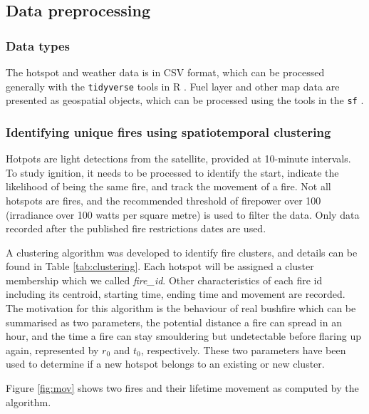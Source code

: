 \documentclass[11pt,a4paper,]{article}
\begin{document}
\hypertarget{data-preprocessing}{%
\subsection{Data preprocessing}\label{data-preprocessing}}

\hypertarget{data-types}{%
\subsubsection{Data types}\label{data-types}}

The hotspot and weather data is in CSV format, which can be processed generally with the \texttt{tidyverse} \autocite{R-tidyverse} tools in R \autocite{R}. Fuel layer and other map data are presented as geospatial objects, which can be processed using the tools in the \texttt{sf} \autocite{R-sf}.

\hypertarget{identifying-unique-fires-using-spatiotemporal-clustering}{%
\subsubsection{Identifying unique fires using spatiotemporal clustering}\label{identifying-unique-fires-using-spatiotemporal-clustering}}

Hotpots are light detections from the satellite, provided at 10-minute intervals. To study ignition, it needs to be processed to identify the start, indicate the likelihood of being the same fire, and track the movement of a fire. Not all hotspots are fires, and the recommended threshold of firepower over 100 (irradiance over 100 watts per square metre) is used to filter the data. Only data recorded after the published fire restrictions dates are used.

A clustering algorithm was developed to identify fire clusters, and details can be found in Table \ref{tab:clustering}. Each hotspot will be assigned a cluster membership which we called \emph{fire\_id}. Other characteristics of each fire id including its centroid, starting time, ending time and movement are recorded. The motivation for this algorithm is the behaviour of real bushfire which can be summarised as two parameters, the potential distance a fire can spread in an hour, and the time a fire can stay smouldering but undetectable before flaring up again, represented by \(r_0\) and \(t_0\), respectively. These two parameters have been used to determine if a new hotspot belongs to an existing or new cluster.

Figure \ref{fig:mov} shows two fires and their lifetime movement as computed by the algorithm.
\end{document}
